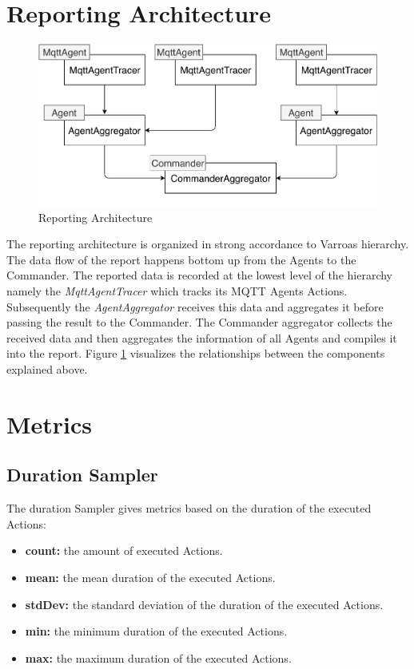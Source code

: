 \section{Reporting Architecture}\label{sec:ReportingArchitecture}
\begin{figure}[H]
	\begin{center}
		\includegraphics[scale=0.75]{Resources/PDF/ReportingArchitecture}
		\caption{Reporting Architecture}
		\label{fig:ReportingArchitecture}
	\end{center}
\end{figure}
The reporting architecture is organized in strong accordance to Varroas hierarchy.
The data flow of the report happens bottom up from the Agents to the Commander.
The reported data is recorded at the lowest level of the hierarchy namely the \emph{MqttAgentTracer} which tracks its MQTT Agents Actions.
Subsequently the \emph{AgentAggregator} receives this data and aggregates it before passing the result to the Commander.
The Commander aggregator collects the received data and then aggregates the information of all Agents and compiles it into the report.
Figure \ref{fig:ReportingArchitecture} visualizes the relationships between the components explained above.

\section{Metrics}
\subsection{Duration Sampler}
The duration Sampler gives metrics based on the duration of the executed Actions:
\begin{itemize}
	\item \textbf{count:} the amount of executed Actions.
	\item \textbf{mean:} the mean duration of the executed Actions.
	\item \textbf{stdDev:} the standard deviation of the duration of the executed Actions.
	\item \textbf{min:} the minimum duration of the executed Actions.
	\item \textbf{max:} the maximum duration of the executed Actions.
\end{itemize}
